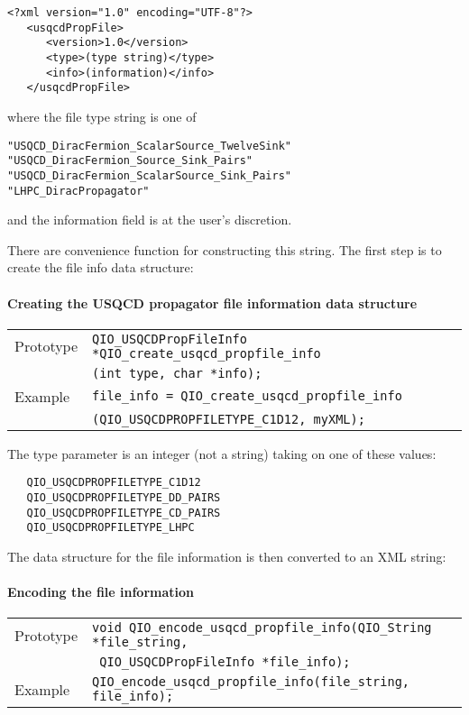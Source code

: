 \documentclass{article}
\begin{document}
\begin{verbatim}
<?xml version="1.0" encoding="UTF-8"?>
   <usqcdPropFile>
      <version>1.0</version>
      <type>(type string)</type>
      <info>(information)</info>
   </usqcdPropFile>
\end{verbatim}
%
where the file type string is one of
%
\begin{verbatim}
"USQCD_DiracFermion_ScalarSource_TwelveSink"
"USQCD_DiracFermion_Source_Sink_Pairs"
"USQCD_DiracFermion_ScalarSource_Sink_Pairs"
"LHPC_DiracPropagator"
\end{verbatim}
%
and the information field is at the user's discretion.

There are convenience function for constructing this string.
The first step is to create the file info data structure:

\paragraph{Creating the USQCD propagator file information data structure}
%
\begin{flushleft}
  \begin{tabular}{|l|l|}
  \hline
  Prototype      & \verb|QIO_USQCDPropFileInfo *QIO_create_usqcd_propfile_info|\\
                 & \verb|(int type, char *info);|\\
\hline
  Example  & \verb|file_info = QIO_create_usqcd_propfile_info |\\
           & \verb|(QIO_USQCDPROPFILETYPE_C1D12, myXML);|\\
   \hline
 \end{tabular}
\end{flushleft}
%
The type parameter is an integer (not a string) taking on one of these
values:
%
\begin{verbatim}
   QIO_USQCDPROPFILETYPE_C1D12   
   QIO_USQCDPROPFILETYPE_DD_PAIRS
   QIO_USQCDPROPFILETYPE_CD_PAIRS
   QIO_USQCDPROPFILETYPE_LHPC    
\end{verbatim}
%

The data structure for the file information is then converted to an
XML string:

\paragraph{Encoding the file information}

%
\begin{flushleft}
  \begin{tabular}{|l|l|}
  \hline
  Prototype      & \verb|void QIO_encode_usqcd_propfile_info(QIO_String *file_string,|\\
                 & \verb| QIO_USQCDPropFileInfo *file_info);|\\
\hline
  Example  & \verb|QIO_encode_usqcd_propfile_info(file_string, file_info);|\\
   \hline
 \end{tabular}
\end{flushleft}
%
\end{document}
